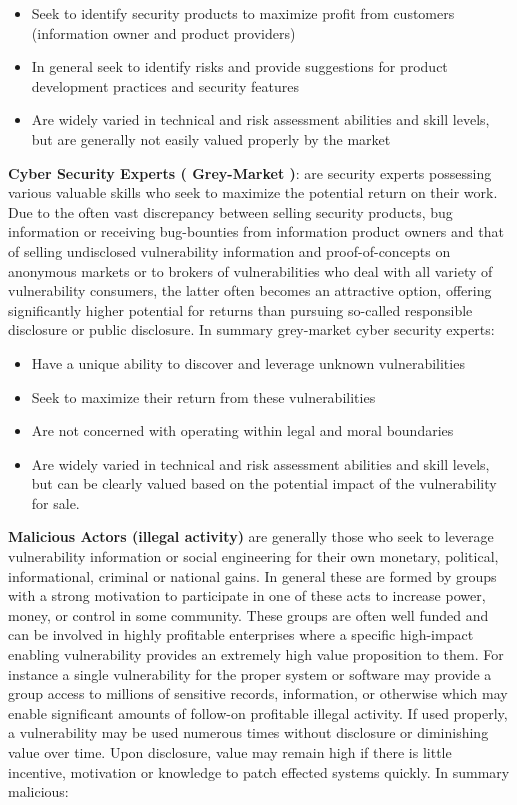 \documentclass[conference]{IEEEtran}
\begin{document}
\begin{itemize}
\item Seek to identify security products to maximize profit from customers (information owner and product providers)
\item In general seek to identify risks and provide suggestions for product development practices and security features
\item Are widely varied in technical and risk assessment abilities and skill levels, but are generally not easily valued properly by the market
\end{itemize}

\textbf{Cyber Security Experts ( Grey-Market )}: are security experts possessing various valuable skills who seek to maximize the potential return on their work.  Due to the often vast discrepancy between selling security products, bug information or receiving bug-bounties from information product owners and that of selling undisclosed vulnerability information and proof-of-concepts on anonymous markets or to brokers of vulnerabilities who deal with all variety of vulnerability consumers, the latter often becomes an attractive option, offering significantly higher potential for returns than pursuing so-called responsible disclosure or public disclosure.   
In summary grey-market cyber security experts:
\begin{itemize}
\item Have a unique ability to discover and leverage unknown vulnerabilities
\item Seek to maximize their return from these vulnerabilities
\item Are not concerned with operating within legal and moral boundaries
\item Are widely varied in technical and risk assessment abilities and skill levels, but can be clearly valued based on the potential impact of the vulnerability for sale.
\end{itemize}

\textbf{Malicious Actors (illegal activity)} are generally those who seek to leverage vulnerability information or social engineering for their own monetary, political, informational, criminal or national gains.  In general these are formed by groups with a strong motivation to participate in one of these acts to increase power, money, or control in some community.   These groups are often well funded and can be involved in highly profitable enterprises where a specific high-impact enabling vulnerability provides an extremely high value proposition to them.  For instance a single vulnerability for the proper system or software may provide a group access to millions of sensitive records, information, or otherwise which may enable significant amounts of follow-on profitable illegal activity.   If used properly, a vulnerability may be used numerous times without disclosure or diminishing value over time.  Upon disclosure, value may remain high if there is little incentive, motivation or knowledge to patch effected systems quickly.
In summary malicious:
\end{document}
